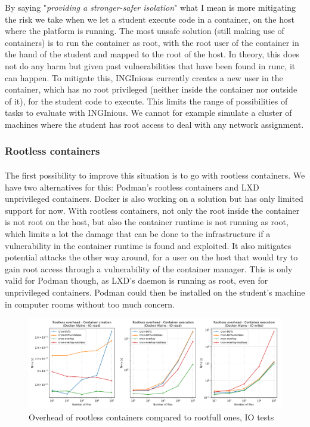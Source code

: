 By saying "\textit{providing a stronger-safer isolation}" what I mean is more mitigating the risk we take when we let a student execute code in a container, on the host where the platform is running.  The most unsafe solution (still making use of containers) is to run the container as root, with the root user of the container in the hand of the student and mapped to the root of the host.  In theory, this does not do any harm but given past vulnerabilities that have been found in runc, it can happen.  To mitigate this, INGInious currently creates a new user in the container, which has no root privileged (neither inside the container nor outside of it), for the student code to execute.  This limits the range of possibilities of tasks to evaluate with INGInious.  We cannot for example simulate a cluster of machines where the student has root access to deal with any network assignment.

\subsubsection{Rootless containers}
\paragraph{}The first possibility to improve this situation is to go with rootless containers.  We have two alternatives for this: Podman's rootless containers and LXD unprivileged containers.  Docker is also working on a solution but has only limited support for now.  With rootless containers, not only the root inside the container is not root on the host, but also the container runtime is not running as root, which limits a lot the damage that can be done to the infrastructure if a vulnerability in the container runtime is found and exploited.  It also mitigates potential attacks the other way around, for a user on the host that would try to gain root access through a vulnerability of the container manager.  This is only valid for Podman though, as LXD's daemon is running as root, even for unprivileged containers.  Podman could then be installed on the student's machine in computer rooms without too much concern.

\begin{figure}[h!]
  \begin{center}
    \includegraphics[width=\linewidth]{images/question-3-rootless-io.png}
    \caption{Overhead of rootless containers compared to rootfull ones, IO tests}
    \label{fig:q3:rootless:io}
  \end{center}
\end{figure}


